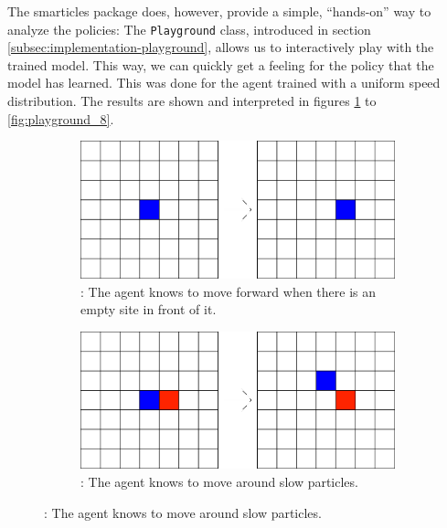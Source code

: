 The smarticles package does, however, provide a simple, \enquote{hands-on} way to analyze the policies: The \texttt{Playground} class, introduced in section \ref{subsec:implementation-playground}, allows us to interactively play with the trained model. This way, we can quickly get a feeling for the policy that the model has learned. This was done for the agent trained with a uniform speed distribution. The results are shown and interpreted in figures \ref{fig:playground_1} to \ref{fig:playground_8}. 

\newcommand\newsubcap[1]{\phantomcaption%
       \caption*{\thefigure\thesubfigure: #1}}

\begin{figure}[H]
        \begin{subfigure}[T]{0.45\textwidth}
            \centering
            \includegraphics[width=\textwidth]{playground/1.png}
            \newsubcap{The agent knows to move forward when there is an empty site in front of it.}
            \label{fig:playground_1}    
        \end{subfigure}
        \hfill
        \begin{subfigure}[T]{0.45\textwidth}
            \centering
            \includegraphics[width=\textwidth]{playground/2.png}
            \newsubcap{The agent knows to move around slow particles.}
            \label{fig:playground_2}
        \end{subfigure}
\end{figure}

